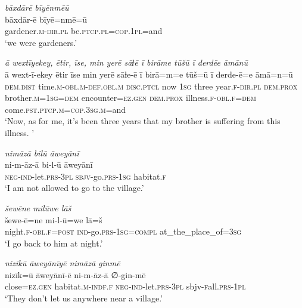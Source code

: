 \ea \label{DG.37}
\textit{bāxdārē bīyēnmēū} \\ 
\gll bāxdār-ē bīyē=nmē=ū \\ 
 gardener\textsc{.m}\textsc{-dir}\textsc{.pl} be\textsc{.ptcp}\textsc{.pl}\textsc{=cop}\textsc{.1pl}=and \\ 
\glt `we were gardeners.'
\z 
 
\ea \label{DG.38}
\textit{ā wextīyekey, ētir, īse, min yerē sāɫē ī birāme tūšū ī derdēe āmānū} \\ 
\gll ā wext-ī-ekey ētir īse min yerē sāɫe-ē ī birā=m=e tūš=ū ī derde-ē=e āmā=n=ū \\ 
 \textsc{dem.dist} time\textsc{.m}\textsc{-obl}\textsc{.m}\textsc{-def}\textsc{.obl}\textsc{.m} \textsc{disc.ptcl} now \textsc{1sg} three year\textsc{\textsc{.f}}\textsc{-dir}\textsc{.pl} \textsc{dem.prox} brother\textsc{.m}\textsc{=1sg}\textsc{=dem} encounter\textsc{=ez}\textsc{.gen} \textsc{dem.prox} illness\textsc{\textsc{.f}}\textsc{-obl}\textsc{\textsc{.f}}\textsc{=dem} come\textsc{.pst}\textsc{.ptcp}\textsc{.m}\textsc{=cop}\textsc{.3sg}\textsc{.m}=and \\ 
\glt `Now, as for me, it’s been three years that my brother is suffering from this illness. '
\z 
 
\ea \label{DG.39}
\textit{nimāzā bilū āweyānī} \\ 
\gll ni-m-āz-ā bi-l-ū āweyānī \\ 
 \textsc{neg-}\textsc{ind-}let\textsc{.prs}\textsc{-3pl} \textsc{sbjv-}go\textsc{.prs}\textsc{-1sg} habitat\textsc{\textsc{.f}} \\ 
\glt `I am not allowed to go to the village.'
\z 
 
\ea \label{DG.41}
\textit{šewēne milūwe lāš} \\ 
\gll šewe-ē=ne mi-l-ū=we lā=š \\ 
 night\textsc{\textsc{.f}}\textsc{-obl}\textsc{\textsc{.f}}\textsc{=\textsc{post}} \textsc{ind-}go\textsc{.prs}\textsc{-1sg}\textsc{=compl} at\_the\_place\_of\textsc{=3sg} \\ 
\glt `I go back to him at night.'
\z 
 
\ea \label{DG.42}
\textit{nizīkū āweyānīyē nimāzā ginmē} \\ 
\gll nizīk=ū āweyānī-ē ni-m-āz-ā ∅-gin-mē \\ 
 close\textsc{=ez}\textsc{.gen} habitat\textsc{\textsc{.m}}\textsc{-indf}\textsc{\textsc{.f}} \textsc{neg-}\textsc{ind-}let\textsc{.prs}\textsc{-3pl} sbjv\textsc{-f}all\textsc{.prs}\textsc{-1pl} \\ 
\glt `They don’t let us anywhere near a village.'
\z 
 
